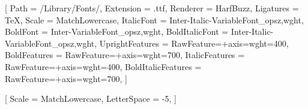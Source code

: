 \setsansfont{Inter-VariableFont_opsz,wght}[
  Path               = /Library/Fonts/,
  Extension          = .ttf,
  Renderer           = HarfBuzz,
  Ligatures          = TeX,
  Scale              = MatchLowercase,
  ItalicFont         = {Inter-Italic-VariableFont_opsz,wght},
  BoldFont           = {Inter-VariableFont_opsz,wght},
  BoldItalicFont     = {Inter-Italic-VariableFont_opsz,wght},
  UprightFeatures    = {RawFeature={+axis={wght=400}}},
  BoldFeatures       = {RawFeature={+axis={wght=700}}},
  ItalicFeatures     = {RawFeature={+axis={wght=400}}},
  BoldItalicFeatures = {RawFeature={+axis={wght=700}}},
]

\setmonofont{FiraCode Nerd Font}[
  Scale       = MatchLowercase,
  LetterSpace = -5,           %
]

\providecommand{\lt}{<}
\providecommand{\gt}{>}

